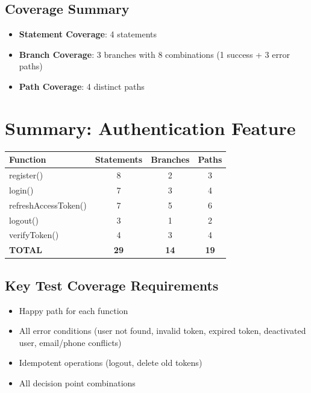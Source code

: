 \subsection{Coverage Summary}
\begin{itemize}
    \item \textbf{Statement Coverage}: 4 statements
    \item \textbf{Branch Coverage}: 3 branches with 8 combinations (1 success + 3 error paths)
    \item \textbf{Path Coverage}: 4 distinct paths
\end{itemize}

\section{Summary: Authentication Feature}

\begin{longtable}{|l|c|c|c|}
\hline
\textbf{Function} & \textbf{Statements} & \textbf{Branches} & \textbf{Paths} \\
\hline
register() & 8 & 2 & 3 \\
\hline
login() & 7 & 3 & 4 \\
\hline
refreshAccessToken() & 7 & 5 & 6 \\
\hline
logout() & 3 & 1 & 2 \\
\hline
verifyToken() & 4 & 3 & 4 \\
\hline
\textbf{TOTAL} & \textbf{29} & \textbf{14} & \textbf{19} \\
\hline
\end{longtable}

\subsection{Key Test Coverage Requirements}
\begin{itemize}
    \item Happy path for each function
    \item All error conditions (user not found, invalid token, expired token, deactivated user, email/phone conflicts)
    \item Idempotent operations (logout, delete old tokens)
    \item All decision point combinations
\end{itemize}
